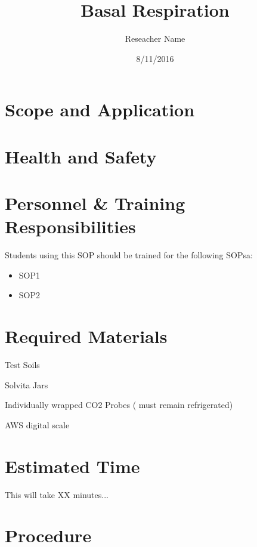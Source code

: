 \documentclass[12pt]{../SOP2}
\title{Basal Respiration}
\date{8/11/2016}
\author{Reseacher Name}
\begin{document}


\maketitle

\section{Scope and Application}

\NP \blindtext

\NP \lipsum[1]

\section{Health and Safety}

\NP \lipsum[2]


\section{Personnel \& Training Responsibilities}

\NP \lipsum[1]

Students using this SOP should be trained for the following SOPsa:

\begin{itemize}
  \item SOP1
  \item SOP2
\end{itemize}


\section{Required Materials}

\NP Test Soils

\NP Solvita Jars

\NP Individually wrapped CO2 Probes ( must remain refrigerated) 

\NP AWS digital scale


\section{Estimated Time}

\NP This will take XX minutes...

\section{Procedure}
\end{document}
